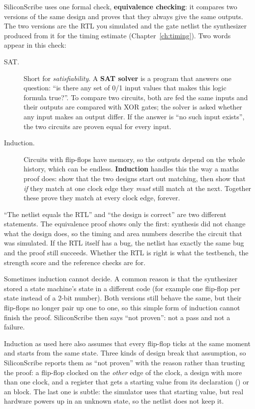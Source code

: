 SiliconScribe uses one formal check, \textbf{equivalence checking}: it compares two versions of the same design and proves that they always give the same outputs. The two versions are the RTL you simulated and the gate netlist the synthesizer produced from it for the timing estimate (Chapter~\ref{ch:timing}). Two words appear in this check:

\begin{description}
  \item[SAT.] Short for \emph{satisfiability}. A \textbf{SAT solver} is a program that answers one question: ``is there any set of 0/1 input values that makes this logic formula true?''. To compare two circuits, both are fed the same inputs and their outputs are compared with XOR gates; the solver is asked whether any input makes an output differ. If the answer is ``no such input exists'', the two circuits are proven equal for every input.
  \item[Induction.] Circuits with flip-flops have memory, so the outputs depend on the whole history, which can be endless. \textbf{Induction} handles this the way a maths proof does: show that the two designs start out matching, then show that \emph{if} they match at one clock edge they \emph{must} still match at the next. Together these prove they match at every clock edge, forever.
\end{description}

\begin{keyidea}
``The netlist equals the RTL'' and ``the design is correct'' are two different statements. The equivalence proof shows only the first: synthesis did not change what the design does, so the timing and area numbers describe the circuit that was simulated. If the RTL itself has a bug, the netlist has exactly the same bug and the proof still succeeds. Whether the RTL is right is what the testbench, the strength score and the reference checks are for.
\end{keyidea}

Sometimes induction cannot decide. A common reason is that the synthesizer stored a state machine's state in a different code (for example one flip-flop per state instead of a 2-bit number). Both versions still behave the same, but their flip-flops no longer pair up one to one, so this simple form of induction cannot finish the proof. SiliconScribe then says ``not proven'': not a pass and not a failure.

Induction as used here also assumes that every flip-flop ticks at the same moment and starts from the same state. Three kinds of design break that assumption, so SiliconScribe reports them as ``not proven'' with the reason rather than trusting the proof: a flip-flop clocked on the \emph{other} edge of the clock, a design with more than one clock, and a register that gets a starting value from its declaration () or an  block. The last one is subtle: the simulator uses that starting value, but real hardware powers up in an unknown state, so the netlist does not keep it.

